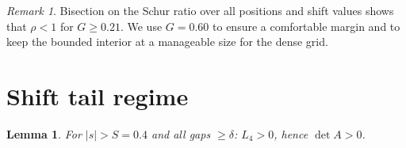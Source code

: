\documentclass[11pt,a4paper]{amsart}
\newtheorem{lemma}[theorem]{Lemma}
\theoremstyle{definition}
\theoremstyle{remark}
\newtheorem{remark}[theorem]{Remark}
\begin{document}
\begin{remark}\label{rem:schur-threshold}
Bisection on the Schur ratio over all positions and shift values
shows that $\rho < 1$ for $G \ge 0.21$.
We use $G = 0.60$ to ensure a comfortable margin and to keep
the bounded interior at a manageable size for the dense grid.
\end{remark}


\section{Shift tail regime}\label{sec:shift}

\begin{lemma}\label{lem:shift}
For $|s| > S = 0.4$ and all gaps $\ge \delta$:
$L_4 > 0$, hence $\det A > 0$.
\end{lemma}
\end{document}
